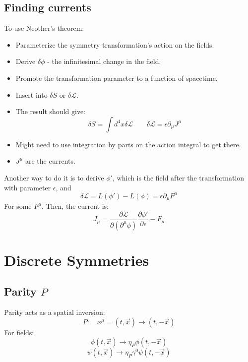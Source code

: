 \documentclass{article}
\begin{document}
\subsection{Finding currents}
To use Neother's theorem:
\begin{itemize}
    \item Parameterize the symmetry transformation's action on the fields.
    \item Derive $\delta \phi$ - the infinitesimal change in the field.
    \item Promote the transformation parameter to a function of spacetime.
    \item Insert into $\delta S$ or $\delta \mathcal{L}$.
    \item The result should give:
    \begin{equation*}
        \delta S = \int d^4x \delta \mathcal{L}
        \qquad
        \delta \mathcal{L} = \epsilon \partial_\mu J^\mu
    \end{equation*}
    \item Might need to use integration by parts on the action integral to get there.
    \item $J^\mu$ are the currents.
\end{itemize}
Another way to do it is to derive $\phi'$, which is the field after the transformation with parameter $\epsilon$, and
\begin{equation*}
    \delta \mathcal{L} = L(\phi') - L(\phi) = \epsilon \partial_\mu F^\mu
\end{equation*}
For some $F^\mu$. Then, the current is:
\begin{equation*}
    J_\mu = \frac{\partial \mathcal{L}}{\partial\left(\partial^\mu \phi\right)}\frac{\partial\phi'}{\partial \epsilon} - F_\mu
\end{equation*}

\section{Discrete Symmetries}
\subsection{Parity $P$}
Parity acts as a spatial inversion:
\begin{equation*}
    P:\quad x^\mu = (t,\vec{x}) \rightarrow (t,-\vec{x})
\end{equation*}
For fields:
\begin{equation*}
    \phi(t,\vec{x}) \rightarrow \eta_P \phi(t,-\vec{x})
\end{equation*}
\begin{equation*}
    \psi(t,\vec{x}) \rightarrow \eta_P \gamma^0 \psi(t,-\vec{x})
\end{equation*}
\end{document}

